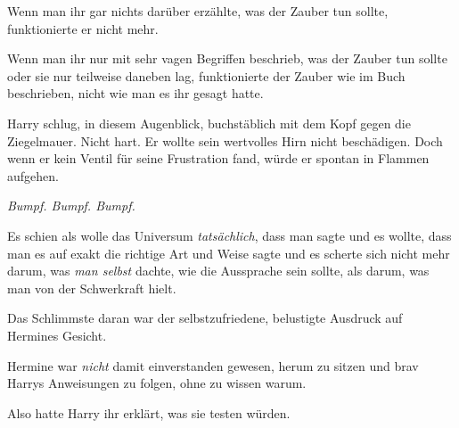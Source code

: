 Wenn man ihr gar nichts darüber erzählte, was der Zauber tun sollte, funktionierte er nicht mehr.

Wenn man ihr nur mit sehr vagen Begriffen beschrieb, was der Zauber tun sollte oder sie nur teilweise daneben lag, funktionierte der Zauber wie im Buch beschrieben, nicht wie man es ihr gesagt hatte.

Harry schlug, in diesem Augenblick, buchstäblich mit dem Kopf gegen die Ziegelmauer. Nicht hart. Er wollte sein wertvolles Hirn nicht beschädigen. Doch wenn er kein Ventil für seine Frustration fand, würde er spontan in Flammen aufgehen.

\emph{Bumpf. Bumpf. Bumpf.}

Es schien als wolle das Universum \emph{tatsächlich}, dass man  sagte und es wollte, dass man es auf exakt die richtige Art und Weise sagte und es scherte sich nicht mehr darum, was \emph{man selbst} dachte, wie die Aussprache sein sollte, als darum, was man von der Schwerkraft hielt.

\emph{}

Das Schlimmste daran war der selbstzufriedene, belustigte Ausdruck auf Hermines Gesicht.

Hermine war \emph{nicht} damit einverstanden gewesen, herum zu sitzen und brav Harrys Anweisungen zu folgen, ohne zu wissen warum.

Also hatte Harry ihr erklärt, was sie testen würden.

